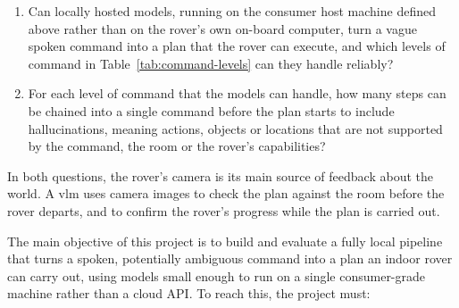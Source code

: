 \begin{enumerate}
    \item[\textbf{RQ1}] Can locally hosted models, running on the consumer host machine defined
    above rather than on the rover's own on-board computer, turn a vague spoken command into a
    plan that the rover can execute, and which levels of command in Table~\ref{tab:command-levels}
    can they handle reliably?
    \item[\textbf{RQ2}] For each level of command that the models can handle, how many steps can
        be chained into a single command before the plan starts to include hallucinations,
        meaning actions, objects or locations that are not supported by the command, the room
        or the rover's capabilities?
\end{enumerate}

In both questions, the rover's camera is its main source of feedback about the world. A
\ac{vlm} uses camera images to check the plan against the room before the rover departs, and to
confirm the rover's progress while the plan is carried out.

\label{sec:objectives}

The main objective of this project is to build and evaluate a fully local pipeline that turns a
spoken, potentially ambiguous command into a plan an indoor rover can carry out, using models
small enough to run on a single consumer-grade machine rather than a cloud API. To reach this,
the project must:

